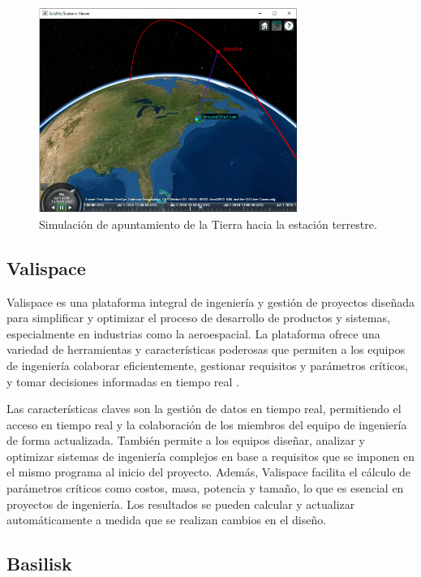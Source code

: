 \begin{itemize}
	\begin{figure}[H]
		\centering    
		\includegraphics[width=0.75\textwidth]{blockset_5.png}
		\caption{Simulación de apuntamiento de la Tierra hacia la estación terrestre.}
		\label{fig:blockset_5}
	\end{figure}	
\end{itemize}

\subsection{Valispace}

Valispace es una plataforma integral de ingeniería y gestión de proyectos diseñada para simplificar y optimizar el proceso de desarrollo de productos y sistemas, especialmente en industrias como la aeroespacial. La plataforma ofrece una variedad de herramientas y características poderosas que permiten a los equipos de ingeniería colaborar eficientemente, gestionar requisitos y parámetros críticos, y tomar decisiones informadas en tiempo real \cite{ref35}.

Las características claves son la gestión de datos en tiempo real, permitiendo el acceso en tiempo real y la colaboración de los miembros del equipo de ingeniería de forma actualizada. También permite a los equipos diseñar, analizar y optimizar sistemas de ingeniería complejos en base a requisitos que se imponen en el mismo programa al inicio del proyecto. Además, Valispace facilita el cálculo de parámetros críticos como costos, masa, potencia y tamaño, lo que es esencial en proyectos de ingeniería. Los resultados se pueden calcular y actualizar automáticamente a medida que se realizan cambios en el diseño.

\subsection{Basilisk}

